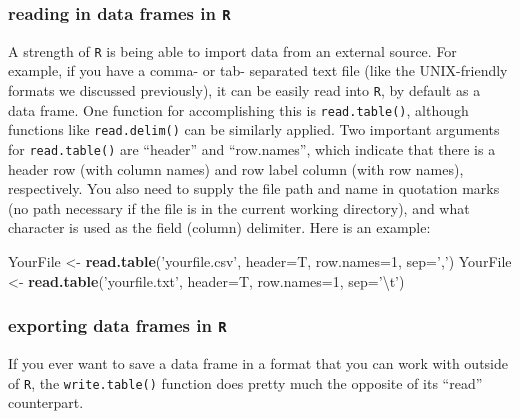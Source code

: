 \documentclass[]{book}
\newenvironment{Shaded}{\begin{snugshade}}{\end{snugshade}}
\newcommand{\CharTok}[1]{\textcolor[rgb]{0.31,0.60,0.02}{#1}}
\newcommand{\DataTypeTok}[1]{\textcolor[rgb]{0.13,0.29,0.53}{#1}}
\newcommand{\DecValTok}[1]{\textcolor[rgb]{0.00,0.00,0.81}{#1}}
\newcommand{\KeywordTok}[1]{\textcolor[rgb]{0.13,0.29,0.53}{\textbf{#1}}}
\newcommand{\NormalTok}[1]{#1}
\newcommand{\StringTok}[1]{\textcolor[rgb]{0.31,0.60,0.02}{#1}}
\begin{document}
\hypertarget{reading-in-data-frames-in-r}{%
\subsubsection{\texorpdfstring{reading in data frames in \texttt{R}}{reading in data frames in R}}\label{reading-in-data-frames-in-r}}

A strength of \texttt{R} is being able to import data from an external source. For example, if you have a comma- or tab- separated text file (like the UNIX-friendly formats we discussed previously), it can be easily read into \texttt{R}, by default as a data frame. One function for accomplishing this is \texttt{read.table()}, although functions like \texttt{read.delim()} can be similarly applied. Two important arguments for \texttt{read.table()} are ``header'' and ``row.names'', which indicate that there is a header row (with column names) and row label column (with row names), respectively. You also need to supply the file path and name in quotation marks (no path necessary if the file is in the current working directory), and what character is used as the field (column) delimiter. Here is an example:

\begin{Shaded}
\begin{Highlighting}[]
\NormalTok{YourFile <-}\StringTok{ }\KeywordTok{read.table}\NormalTok{(}\StringTok{'yourfile.csv'}\NormalTok{, }\DataTypeTok{header=}\NormalTok{T, }\DataTypeTok{row.names=}\DecValTok{1}\NormalTok{, }\DataTypeTok{sep=}\StringTok{','}\NormalTok{)}
\NormalTok{YourFile <-}\StringTok{ }\KeywordTok{read.table}\NormalTok{(}\StringTok{'yourfile.txt'}\NormalTok{, }\DataTypeTok{header=}\NormalTok{T, }\DataTypeTok{row.names=}\DecValTok{1}\NormalTok{, }\DataTypeTok{sep=}\StringTok{'}\CharTok{\textbackslash{}t}\StringTok{'}\NormalTok{)}
\end{Highlighting}
\end{Shaded}

\hypertarget{exporting-data-frames-in-r}{%
\subsubsection{\texorpdfstring{exporting data frames in \texttt{R}}{exporting data frames in R}}\label{exporting-data-frames-in-r}}

If you ever want to save a data frame in a format that you can work with outside of \texttt{R}, the \texttt{write.table()} function does pretty much the opposite of its ``read'' counterpart.
\end{document}
